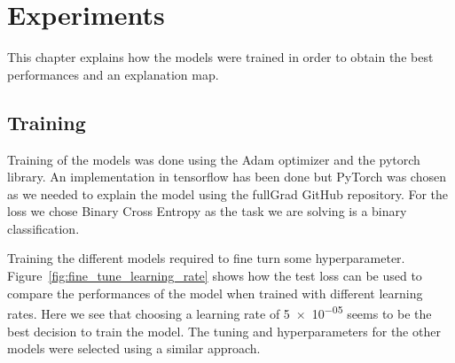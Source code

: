 \chapter{Experiments}
\label{chap:experiments}
This chapter explains how the models were trained in order to obtain the best performances and an explanation map.
\section{Training}
Training of the models was done using the Adam\cite{kingma2014adam} optimizer and the pytorch\cite{pytorch_paszke2017automatic} library. An implementation in tensorflow\cite{tensorflow_45166} has been done but PyTorch was chosen as we needed to explain the model using the fullGrad\cite{fullgradient} GitHub repository. For the loss we chose Binary Cross Entropy as the task we are solving is a binary classification.

Training the different models required to fine turn some hyperparameter. Figure~\ref{fig:fine_tune_learning_rate} shows how the test loss can be used to compare the performances of the model when trained with different learning rates. Here we see that choosing a learning rate of \num{5e-05} seems to be the best decision to train the model. The tuning and hyperparameters for the other models were selected using a similar approach.  

